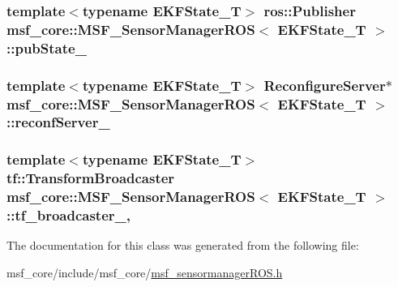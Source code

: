 \hypertarget{structmsf__core_1_1MSF__SensorManagerROS_a2b01bf34569f618f6f9a31d1c34123f9}{
\subsubsection[{pub\-State\-\_\-}]{\setlength{\rightskip}{0pt plus 5cm}template$<$typename E\-K\-F\-State\-\_\-\-T$>$ ros\-::\-Publisher {\bf msf\-\_\-core\-::\-M\-S\-F\-\_\-\-Sensor\-Manager\-R\-O\-S}$<$ E\-K\-F\-State\-\_\-\-T $>$\-::pub\-State\-\_\-\hspace{0.3cm}{\ttfamily [private]}}}\label{structmsf__core_1_1MSF__SensorManagerROS_a2b01bf34569f618f6f9a31d1c34123f9}
\hypertarget{structmsf__core_1_1MSF__SensorManagerROS_a87c60917114e5ce7a56d5caf7e5e7a3f}{
\subsubsection[{reconf\-Server\-\_\-}]{\setlength{\rightskip}{0pt plus 5cm}template$<$typename E\-K\-F\-State\-\_\-\-T$>$ {\bf Reconfigure\-Server}$\ast$ {\bf msf\-\_\-core\-::\-M\-S\-F\-\_\-\-Sensor\-Manager\-R\-O\-S}$<$ E\-K\-F\-State\-\_\-\-T $>$\-::reconf\-Server\-\_\-\hspace{0.3cm}{\ttfamily [private]}}}\label{structmsf__core_1_1MSF__SensorManagerROS_a87c60917114e5ce7a56d5caf7e5e7a3f}
\hypertarget{structmsf__core_1_1MSF__SensorManagerROS_a7c53a1122c69aaf132cec3c8d81fe8e5}{
\subsubsection[{tf\-\_\-broadcaster\-\_\-}]{\setlength{\rightskip}{0pt plus 5cm}template$<$typename E\-K\-F\-State\-\_\-\-T$>$ tf\-::\-Transform\-Broadcaster {\bf msf\-\_\-core\-::\-M\-S\-F\-\_\-\-Sensor\-Manager\-R\-O\-S}$<$ E\-K\-F\-State\-\_\-\-T $>$\-::tf\-\_\-broadcaster\-\_\-\hspace{0.3cm}{\ttfamily [mutable]}, {\ttfamily [private]}}}\label{structmsf__core_1_1MSF__SensorManagerROS_a7c53a1122c69aaf132cec3c8d81fe8e5}


The documentation for this class was generated from the following file\-:\begin{DoxyCompactItemize}
\item 
msf\-\_\-core/include/msf\-\_\-core/\hyperlink{msf__sensormanagerROS_8h}{msf\-\_\-sensormanager\-R\-O\-S.\-h}\end{DoxyCompactItemize}
